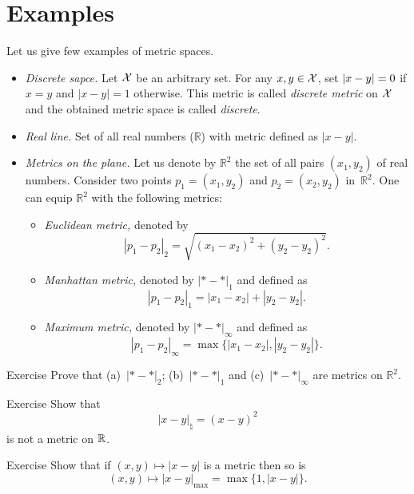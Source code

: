 \section{Examples}

Let us give few examples of metric spaces.

\begin{itemize}
\item\emph{Discrete sapce.}\label{page:Discrete metric} Let $\mathcal X$ be an arbitrary set. 
For any $x,y\z\in\c X$, 
set $|x-y|\z=0$ if $x=y$ and $|x-y|=1$ otherwise.
This metric is called \emph{discrete metric} on $\mathcal X$ and the obtained metric space is called \emph{discrete}.
\item{}\emph{Real line.} 
Set of all real numbers ($\mathbb{R}$) with metric defined as 
$|x-y|$.
\item {}\emph{Metrics on the plane.}\label{page:Metrics on the plane}
Let us denote by $\mathbb{R}^2$ the set of all pairs $(x_1,y_2)$ of real numbers.
Consider two points $p_1=(x_1,y_2)$ and $p_2=(x_2,y_2)$  in~$\mathbb{R}^2$.
One can equip $\mathbb{R}^2$ with the following metrics:
\begin{itemize}
\item{}\emph{Euclidean metric,} denoted by 
$$|p_1-p_2|_2=\sqrt{(x_1-x_2)^2+(y_2-y_2)^2}.$$
\item\label{Manhattan plane}\emph{Manhattan metric,} denoted by $|{*}-{*}|_1$ and defined as 
$$|p_1-p_2|_1=|x_1-x_2|+|y_2-y_2|.$$
\item{}\emph{Maximum metric,} denoted by $|{*}-{*}|_\infty$ and defined as 
$$|p_1-p_2|_\infty=\max\{|x_1-x_2|,|y_2-y_2|\}.$$
\end{itemize}
\end{itemize}

\begin{thm}{Exercise}\label{ex:d1+d2+dinfty}
Prove that (a)~$|{*}-{*}|_2$; (b)~$|{*}-{*}|_1$ and (c)~$|{*}-{*}|_\infty$ are metrics on $\mathbb{R}^2$.
\end{thm}

\begin{thm}{Exercise}\label{ex:not-a-metric}
Show that 
\[|x-y|_{\natural}=(x-y)^2\]
is not a metric on $\mathbb{R}$.
\end{thm}

\begin{thm}{Exercise}\label{ex:metric}
Show that if $(x,y)\mapsto |{x}-{y}|$ is a metric then so is 
\[(x,y)\mapsto |{x}-{y}|_{\max}=\max\{1,|{x}-{y}|\}.\] 
\end{thm}


